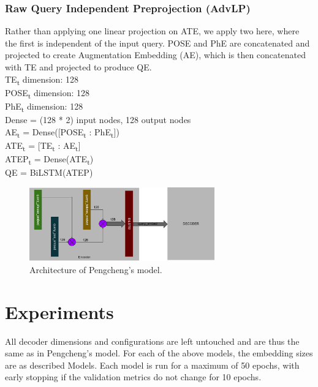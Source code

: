 \documentclass{IEEEtran}
\begin{document}
        \subsubsection{Raw Query Independent Preprojection (AdvLP)}
        Rather than applying one linear projection on ATE, we apply two here, where the first is 
        independent of the input query. POSE and PhE are concatenated and projected to create
        Augmentation Embedding (AE), which is then concatenated with TE and projected to produce
        QE. \\

        \hspace*{-3.5mm}TE\textsubscript{t} dimension: 128 \\
        POSE\textsubscript{t} dimension: 128 \\
        PhE\textsubscript{t} dimension: 128 \\
        Dense = (128 * 2) input nodes, 128 output nodes \\ 

        \hspace*{-3.5mm}AE\textsubscript{t} = Dense([POSE\textsubscript{t} : 
        PhE\textsubscript{t}]) \\
        ATE\textsubscript{t} = [TE\textsubscript{t} : AE\textsubscript{t}] \\
        ATEP\textsubscript{t} = Dense(ATE\textsubscript{t}) \\
        QE = BiLSTM(ATEP) \\

        \begin{figure}[h]
          \centering
          \includegraphics[width=8cm]{advlp.png}
          \caption{Architecture of Pengcheng's model.}
          \label{fig:advlp}
        \end{figure}

    \blindtext

    \section{Experiments}
    All decoder dimensions and configurations are left untouched and are thus the same as in
    Pengcheng's model. For each of the above models, the embedding sizes are as described Models.
    Each model is run for a maximum of 50 epochs, with early stopping if the validation
    metrics do not change for 10 epochs.
\end{document}
